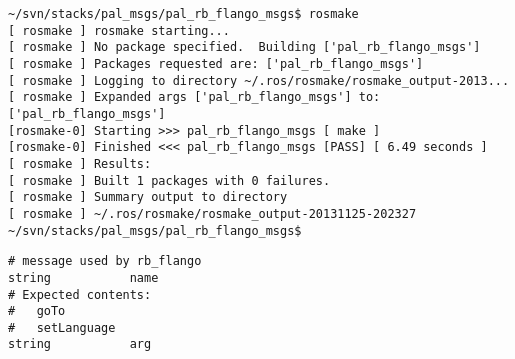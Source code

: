 \begin{lstlisting}[caption=Creation of a ROS Message, label=impl-ros-create-message]
~/svn/stacks/pal_msgs/pal_rb_flango_msgs$ rosmake
[ rosmake ] rosmake starting...                                                                                                                                                                                     
[ rosmake ] No package specified.  Building ['pal_rb_flango_msgs']                                                                                                                                                  
[ rosmake ] Packages requested are: ['pal_rb_flango_msgs']                                                                                                                                                          
[ rosmake ] Logging to directory ~/.ros/rosmake/rosmake_output-2013...
[ rosmake ] Expanded args ['pal_rb_flango_msgs'] to:
['pal_rb_flango_msgs']                                                                                                                                         
[rosmake-0] Starting >>> pal_rb_flango_msgs [ make ]                                                                                                                                                                
[rosmake-0] Finished <<< pal_rb_flango_msgs [PASS] [ 6.49 seconds ]                                                                                                                                                 
[ rosmake ] Results:                                                                                                                                                                                                
[ rosmake ] Built 1 packages with 0 failures.                                                                                                                                                                       
[ rosmake ] Summary output to directory                                                                                                                                                                             
[ rosmake ] ~/.ros/rosmake/rosmake_output-20131125-202327                                                                                                                                         
~/svn/stacks/pal_msgs/pal_rb_flango_msgs$ 
\end{lstlisting}

\begin{lstlisting}[caption=Message type from robotBehaviour to Flango CM (rbFlango.msg), label=impl-flango-ros-message]
# message used by rb_flango
string           name
# Expected contents:
#   goTo
#   setLanguage
string           arg
\end{lstlisting}

